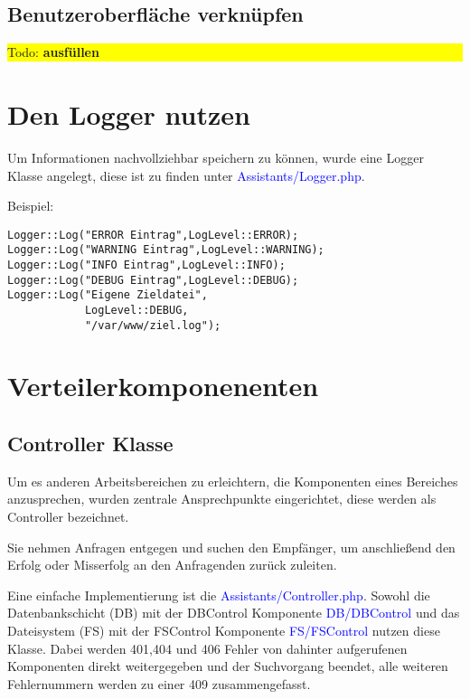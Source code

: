 \documentclass[10pt,a4paper,final,parskip]{scrartcl}
\newcommand{\blau}[1]{\textcolor{blue}{#1}}
\newcommand{\todo}[1]{\colorbox{yellow}{\parbox{\textwidth}{Todo: \textbf{#1}}}}
\begin{document}
\subsection{Benutzeroberfläche verknüpfen}
\todo{ausfüllen}




 

  


\section{Den Logger nutzen}
Um Informationen nachvollziehbar speichern zu können, wurde eine Logger Klasse angelegt, diese ist zu finden unter \blau{Assistants/Logger.php}.

\begin{minipage}{\textwidth}
Beispiel:
\begin{lstlisting}
Logger::Log("ERROR Eintrag",LogLevel::ERROR);
Logger::Log("WARNING Eintrag",LogLevel::WARNING);
Logger::Log("INFO Eintrag",LogLevel::INFO);
Logger::Log("DEBUG Eintrag",LogLevel::DEBUG);
Logger::Log("Eigene Zieldatei",
            LogLevel::DEBUG, 
            "/var/www/ziel.log");
\end{lstlisting}
\end{minipage}
 
\section{Verteilerkomponenenten}
\subsection{Controller Klasse}
Um es anderen Arbeitsbereichen zu erleichtern, die Komponenten eines Bereiches anzusprechen, wurden zentrale Ansprechpunkte eingerichtet, diese werden als Controller bezeichnet.

Sie nehmen Anfragen entgegen und suchen den Empfänger, um anschließend den Erfolg oder Misserfolg an den Anfragenden zurück zuleiten.

Eine einfache Implementierung ist die \blau{Assistants/Controller.php}. Sowohl die Datenbankschicht (DB) mit der DBControl Komponente \blau{DB/DBControl} und das Dateisystem (FS) mit der FSControl Komponente \blau{FS/FSControl} nutzen diese Klasse. Dabei werden 401,404 und 406 Fehler von dahinter aufgerufenen Komponenten direkt weitergegeben und der Suchvorgang beendet, alle weiteren Fehlernummern werden zu einer 409 zusammengefasst.
\end{document}
